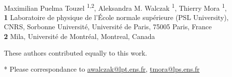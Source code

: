 \documentclass[10pt,letterpaper]{article}
\newcommand{\<}{\langle}
\renewcommand{\>}{\rangle}
\begin{document}
\vspace*{0.2in}

\begin{flushleft}
{\Large
\textbf{}
}
\newline
\\
Maximilian Puelma Touzel \textsuperscript{1,2},
Aleksandra M. Walczak \textsuperscript{1\Yinyang*},
Thierry Mora \textsuperscript{1\Yinyang*},
\\
\bigskip
\textbf{1} Laboratoire de physique de l'\'Ecole normale sup\'erieure
  (PSL University), CNRS, Sorbonne  Universit\'e, Universit\'e de
  Paris, 75005 Paris, France
\\
\textbf{2} Mila, Université de Montréal, Montreal, Canada
\\
\bigskip

% 
%
\Yinyang These authors contributed equally to this work.





* Please correspondance to \url{awalczak@lpt.ens.fr}, \url{tmora@lps.ens.fr}

\end{flushleft}
\end{document}
